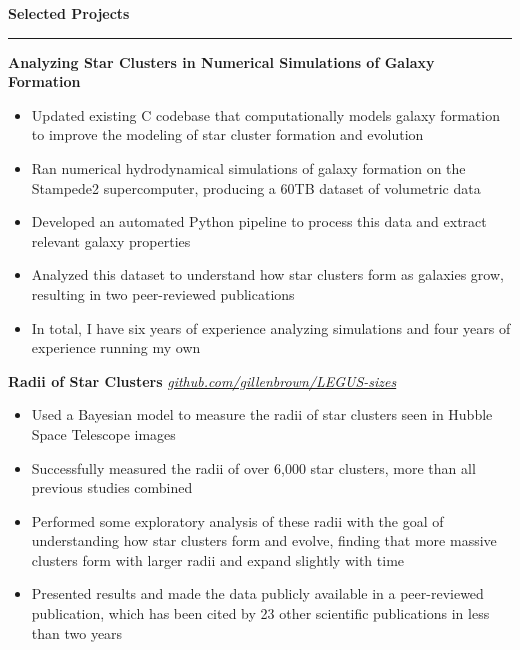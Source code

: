 \documentclass[10pt]{article}
\newcommand{\header}[1]{\vspace{0.7em}\par \textbf{\large #1}\strut\hrule\vspace{-0.6em}}
\newcommand{\actionHeader}[2]{\vspace{0.3em}\textbf{#1} \hfill #2}
\newcommand{\actionHeaderSecondLine}[2]{\newline \textit{#1} \hfill #2}
\begin{document}
\vspace{-1em}
\header{Selected Projects}
\actionHeader{Analyzing Star Clusters in Numerical Simulations of Galaxy Formation}{}
\begin{itemize}
    \item Updated existing C codebase that computationally models galaxy formation to improve the modeling of star cluster formation and evolution
    \item Ran numerical hydrodynamical simulations of galaxy formation on the Stampede2 supercomputer, producing a 60TB dataset of volumetric data
    \item Developed an automated Python pipeline to process this data and extract relevant galaxy properties
    \item Analyzed this dataset to understand how star clusters form as galaxies grow, resulting in two peer-reviewed publications
    \item In total, I have six years of experience analyzing simulations and four years of experience running my own
\end{itemize}

\actionHeader{Radii of Star Clusters}{}
\actionHeaderSecondLine{\href{https://github.com/gillenbrown/LEGUS-sizes}{github.com/gillenbrown/LEGUS-sizes}}{}
\begin{itemize}
    \item Used a Bayesian model to measure the radii of star clusters seen in Hubble Space Telescope images
    \item Successfully measured the radii of over 6,000 star clusters, more than all previous studies combined
    \item Performed some exploratory analysis of these radii with the goal of understanding how star clusters form and evolve, finding that more massive clusters form with larger radii and expand slightly with time
    \item Presented results and made the data publicly available in a peer-reviewed publication, which has been cited by 23 other scientific publications in less than two years 
\end{itemize}

\end{document}
